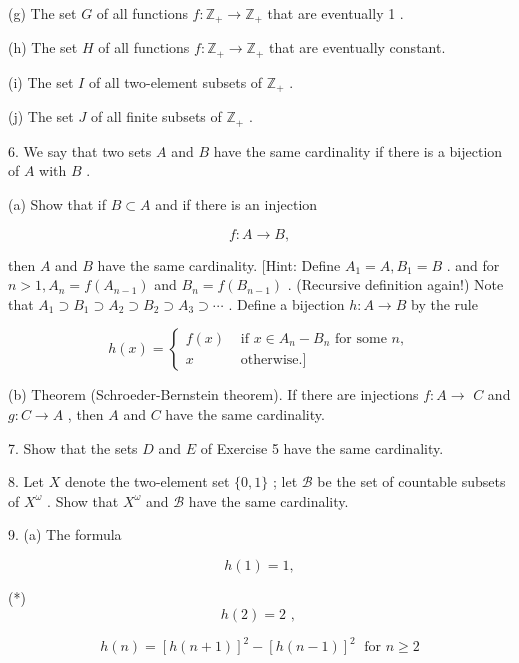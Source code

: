 (g) The set \(G\) of all functions \(f : {\mathbb{Z}}_{ + } \rightarrow  {\mathbb{Z}}_{ + }\) that are eventually 1 .

(h) The set \(H\) of all functions \(f : {\mathbb{Z}}_{ + } \rightarrow  {\mathbb{Z}}_{ + }\) that are eventually constant.

(i) The set \(I\) of all two-element subsets of \({\mathbb{Z}}_{ + }\) .

(j) The set \(J\) of all finite subsets of \({\mathbb{Z}}_{ + }\) .

6. We say that two sets \(A\) and \(B\) have the same cardinality if there is a bijection of \(A\) with \(B\) .

(a) Show that if \(B \subset  A\) and if there is an injection

\[
f : A \rightarrow  B,
\]

then \(A\) and \(B\) have the same cardinality. [Hint: Define \({A}_{1} = A,{B}_{1} = B\) . and for \(n > 1,{A}_{n} = f\left( {A}_{n - 1}\right)\) and \({B}_{n} = f\left( {B}_{n - 1}\right)\) . (Recursive definition again!) Note that \({A}_{1} \supset  {B}_{1} \supset  {A}_{2} \supset  {B}_{2} \supset  {A}_{3} \supset  \cdots\) . Define a bijection \(h : A \rightarrow  B\) by the rule

\[
h\left( x\right)  = \left\{  \begin{array}{ll} f\left( x\right) & \text{ if }x \in  {A}_{n} - {B}_{n}\text{ for some }n, \\  x & \text{ otherwise.] } \end{array}\right.
\]

(b) Theorem (Schroeder-Bernstein theorem). If there are injections \(f : A \rightarrow\)  \(C\) and \(g : C \rightarrow  A\) , then \(A\) and \(C\) have the same cardinality.

7. Show that the sets \(D\) and \(E\) of Exercise 5 have the same cardinality.

8. Let \(X\) denote the two-element set \(\{ 0,1\}\) ; let \(\mathcal{B}\) be the set of countable subsets of \({X}^{\omega }\) . Show that \({X}^{\omega }\) and \(\mathcal{B}\) have the same cardinality.

9. (a) The formula

\[
h\left( 1\right)  = 1,
\]

(*)
\[
h\left( 2\right)  = 2\text{ , }
\]

\[
h\left( n\right)  = {\left\lbrack  h\left( n + 1\right) \right\rbrack  }^{2} - {\left\lbrack  h\left( n - 1\right) \right\rbrack  }^{2}\;\text{ for }n \geq  2
\]

